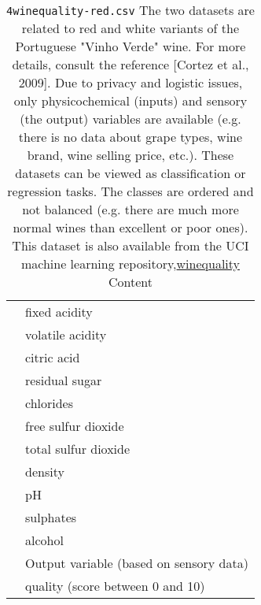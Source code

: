 \documentclass[12pt]{article}
\theoremstyle{remark}
\begin{document}
\begin{table}
	\caption{ \texttt{4winequality-red.csv}
The two datasets are related to red and white variants of the Portuguese "Vinho Verde" wine. For more details, consult the reference [Cortez et al., 2009]. Due to privacy and logistic issues, only physicochemical (inputs) and sensory (the output) variables are available (e.g. there is no data about grape types, wine brand, wine selling price, etc.). These datasets can be viewed as classification or regression tasks. The classes are ordered and not balanced (e.g. there are much more normal wines than excellent or poor ones). This dataset is also available from the UCI machine learning repository,\href{ https://archive.ics.uci.edu/ml/datasets/wine+quality}{winequality} Content
}
	\begin{tabular}{l|l}\hline
&	 fixed acidity \\
&	 volatile acidity \\ 
&	 citric acid \\
&	 residual sugar \\
&	 chlorides \\
&	 free sulfur dioxide \\
&	 total sulfur dioxide \\
&	 density \\
&	 pH \\
&	 sulphates \\
&	 alcohol \\
&	Output variable (based on sensory data) \\
&	 quality (score between 0 and 10) \\
	\hline
	\end{tabular}
\end{table}
\end{document}
